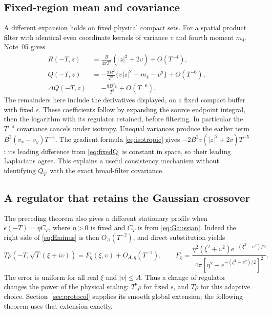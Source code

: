 \subsection{Fixed-region mean and covariance}
A different expansion holds on fixed physical compact sets.
For a spatial product filter with identical even coordinate kernels
of variance $v$ and fourth moment $m_4$, Note~05 gives
\begin{align}
 R(-T,z)&=\frac{B}{4\pi T^3}(|z|^2+2v)+O(T^{-4}), \label{eq:fixedR}\\
 Q(-T,z)&=-\frac{2B^2}{T^5}\{v|z|^2+m_4-v^2\}
            +O(T^{-6}), \label{eq:fixedQ}\\
 \Delta Q(-T,z)&=-\frac{8B^2v}{T^5}+O(T^{-6}). \label{eq:fixedlapQ}
\end{align}
The remainders here include the derivatives displayed, on a fixed
compact buffer with fixed $\epsilon$.
These coefficients follow by expanding the source endpoint integral,
then the logarithm with its regulator retained, before filtering.
In particular the $T^{-4}$ covariance cancels under isotropy.
Unequal variances produce the earlier term
$B^2(v_x-v_y)T^{-4}$.
The gradient formula \eqref{eq:isotropic} gives
$-2B^2v(|z|^2+2v)T^{-5}$: its leading difference from
\eqref{eq:fixedQ} is constant in space, so their leading Laplacians agree.
This explains a useful consistency mechanism without identifying
$Q_\nabla$ with the exact broad-filter covariance.

\subsection{A regulator that retains the Gaussian crossover}
The preceding theorem also gives a different stationary profile when
$\epsilon(-T)=\eta C_T$, where $\eta>0$ is fixed and $C_T$ is from
\eqref{eq:Gaussian}. Indeed the right side of \eqref{eq:Eminus} is then
$O_A(T^{-2})$, and direct substitution yields
\begin{equation}
 T\rho(-T,\sqrt T(\xi+i\upsilon))
 =F_\eta(\xi,\upsilon)+O_{A,\eta}(T^{-1}),\qquad
 F_\eta=\frac{\eta^2(\xi^2+\upsilon^2)e^{-(\xi^2-\upsilon^2)/2}}
 {4\pi[\eta^2+e^{-(\xi^2-\upsilon^2)/2}]^2}.
 \label{eq:adaptiveNegative}
\end{equation}
The error is uniform for all real $\xi$ and $|\upsilon|\le A$.
Thus a change of regulator changes the power of the physical scaling:
$T^2\rho$ for fixed $\epsilon$, and $T\rho$ for this adaptive choice.
Section~\ref{sec:protocol} supplies its smooth global extension; the
following theorem uses that extension exactly.

